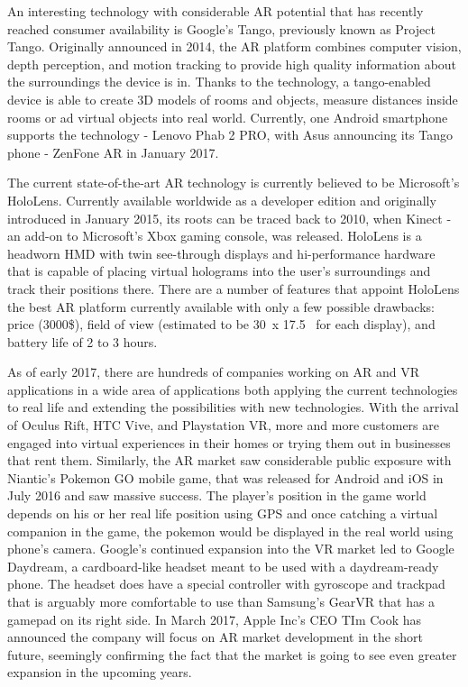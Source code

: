 \documentclass[12pt, a4paper]{article}
\begin{document}
An interesting technology with considerable AR potential that has recently reached consumer availability is Google’s Tango, previously known as Project Tango. Originally announced in 2014, the AR platform combines computer vision, depth perception, and motion tracking to provide high quality information about the surroundings the device is in. Thanks to the technology, a tango-enabled device is able to create 3D models of rooms and objects, measure distances inside rooms or ad virtual objects into real world. Currently, one Android smartphone supports the technology - Lenovo Phab 2 PRO, with Asus announcing its Tango phone - ZenFone AR in January 2017.

The current state-of-the-art AR technology is currently believed to be Microsoft’s HoloLens. Currently available worldwide as a developer edition and originally introduced in January 2015, its roots can be traced back to 2010, when Kinect - an add-on to Microsoft’s Xbox gaming console, was released. HoloLens is a headworn HMD with twin see-through displays and hi-performance hardware that is capable of placing virtual holograms into the user’s surroundings and track their positions there. There are a number of features that appoint HoloLens the best AR platform currently available with only a few possible drawbacks: price (3000\$), field of view (estimated to be 30\degree~x 17.5\degree~ for each display), and battery life of 2 to 3 hours. 


As of early 2017, there are hundreds of companies working on AR and VR applications in a wide area of applications both applying the current technologies to real life and extending the possibilities with new technologies. With the arrival of Oculus Rift, HTC Vive, and Playstation VR, more and more customers are engaged into virtual experiences in their homes or trying them out in businesses that rent them. Similarly, the AR market saw considerable public exposure with Niantic’s Pokemon GO mobile game, that was released for Android and iOS in July 2016 and saw massive success. The player’s position in the game world depends on his or her real life position using GPS and once catching a virtual companion in the game, the pokemon would be displayed in the real world using phone’s camera. Google’s continued expansion into the VR market led to Google Daydream, a cardboard-like headset meant to be used with a daydream-ready phone. The headset does have a special controller with gyroscope and trackpad that is arguably more comfortable to use than Samsung’s GearVR that has a gamepad on its right side. In March 2017, Apple Inc’s CEO TIm Cook has announced the company will focus on AR market development in the short future, seemingly confirming the fact that the market is going to see even greater expansion in the upcoming years.
\end{document}
